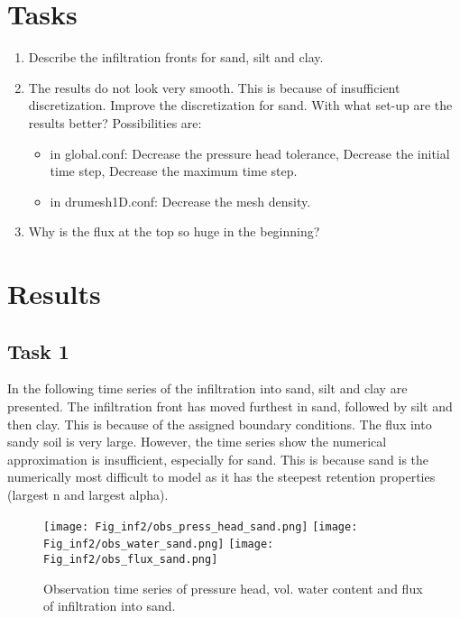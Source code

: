 \section*{Tasks}

\begin{enumerate}
\item Describe the infiltration fronts for sand, silt and clay.
\item The results do not look very smooth. This is because of insufficient discretization. Improve the discretization for sand. With what set-up are the results better? Possibilities are: 
\begin{itemize}
\item in global.conf: Decrease the pressure head tolerance, Decrease the initial time step, Decrease the maximum time step.
\item in drumesh1D.conf: Decrease the mesh density. 
\end{itemize}
\item Why is the flux at the top so huge in the beginning?
\end{enumerate}



\section*{Results}

\subsection*{Task 1}
In the following time series of the infiltration into sand, silt and clay are presented. The infiltration front has moved furthest in sand, followed by silt and then clay. This is because of the assigned boundary conditions. The flux into sandy soil is very large. However, the time series show the numerical approximation is insufficient, especially for sand. This is because sand is the numerically most difficult to model as it has the steepest retention properties (largest n and largest alpha).

\begin{figure}[!h]
\centering
\texttt{[image: Fig\_inf2/obs\_press\_head\_sand.png]}
\texttt{[image: Fig\_inf2/obs\_water\_sand.png]}
\texttt{[image: Fig\_inf2/obs\_flux\_sand.png]}
\caption{Observation time series of pressure head, vol. water content and flux of infiltration into sand.}
\end{figure}

